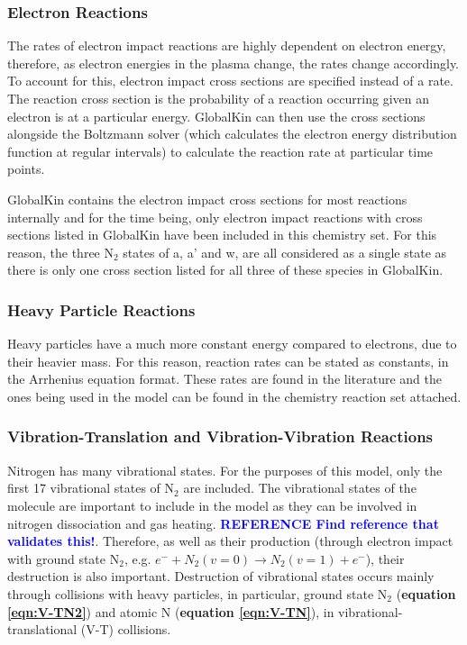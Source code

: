 \documentclass[11pt, oneside]{article}   	%
\newcommand{\toref}[1]{ \textcolor{blue}{\bf{REFERENCE #1}}}
\begin{document}
\subsubsection*{Electron Reactions}
The rates of electron impact reactions are highly dependent on electron energy, therefore, as electron energies in the plasma change, the rates change accordingly.
To account for this, electron impact cross sections are specified instead of a rate.
The reaction cross section is the probability of a reaction occurring given an electron is at a particular energy.
GlobalKin can then use the cross sections alongside the Boltzmann solver (which calculates the electron energy distribution function at regular intervals) to calculate the reaction rate at particular time points.

GlobalKin contains the electron impact cross sections for most reactions internally and for the time being, only electron impact reactions with cross sections listed in GlobalKin have been included in this chemistry set.
For this reason, the three N$_2$ states of a, a' and w, are all considered as a single state as there is only one cross section listed for all three of these species in GlobalKin.

\subsubsection*{Heavy Particle Reactions}
Heavy particles have a much more constant energy compared to electrons, due to their heavier mass. 
For this reason, reaction rates can be stated as constants, in the Arrhenius equation format.
These rates are found in the literature and the ones being used in the model can be found in the chemistry reaction set attached.


\subsubsection*{Vibration-Translation and Vibration-Vibration Reactions}

Nitrogen has many vibrational states.
For the purposes of this model, only the first 17 vibrational states of N$_2$ are included.
The vibrational states of the molecule are important to include in the model as they can be involved in nitrogen dissociation and gas heating. \toref{Find reference that validates this!}.
Therefore, as well as their production (through electron impact with ground state N$_2$, e.g. $e^- + N_2(v=0) \rightarrow N_2(v=1) + e^-$), their destruction is also important.
Destruction of vibrational states occurs mainly through collisions with heavy particles, in particular, ground state N$_2$ (\textbf{equation \ref{eqn:V-TN2}}) and atomic N (\textbf{equation \ref{eqn:V-TN}}), in vibrational-translational (V-T) collisions.
\end{document}
